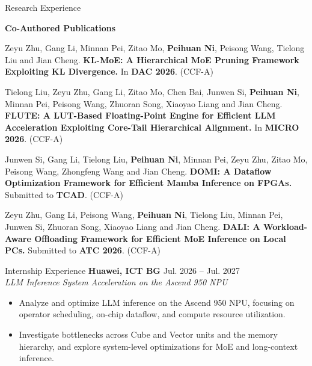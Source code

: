 \documentclass{resume}
\newenvironment{publicationentry}{\begin{list}{}{\setlength{\leftmargin}{0.6em}\setlength{\rightmargin}{0em}\setlength{\topsep}{3pt}\setlength{\partopsep}{0pt}\setlength{\parsep}{0pt}\setlength{\itemsep}{0pt}}\item[]}{\end{list}}
\begin{document}
\begin{rSection}{Research Experience}

\textbf{Co-Authored Publications}
\begin{publicationentry}
Zeyu Zhu, Gang Li, Minnan Pei, Zitao Mo, \textbf{Peihuan Ni}, Peisong Wang, Tielong Liu and Jian Cheng.
\textbf{KL-MoE: A Hierarchical MoE Pruning Framework Exploiting KL Divergence.}
In \textbf{DAC 2026}. (CCF-A)
\end{publicationentry}
\begin{publicationentry}
Tielong Liu, Zeyu Zhu, Gang Li, Zitao Mo, Chen Bai, Junwen Si, \textbf{Peihuan Ni}, Minnan Pei, Peisong Wang, Zhuoran Song, Xiaoyao Liang and Jian Cheng.
\textbf{FLUTE: A LUT-Based Floating-Point Engine for Efficient LLM Acceleration Exploiting Core-Tail Hierarchical Alignment.}
In \textbf{MICRO 2026}. (CCF-A)
\end{publicationentry}
\begin{publicationentry}
Junwen Si, Gang Li, Tielong Liu, \textbf{Peihuan Ni}, Minnan Pei, Zeyu Zhu, Zitao Mo, Peisong Wang, Zhongfeng Wang and Jian Cheng.
\textbf{DOMI: A Dataflow Optimization Framework for Efficient Mamba Inference on FPGAs.}
Submitted to \textbf{TCAD}. (CCF-A)
\end{publicationentry}
\begin{publicationentry}
Zeyu Zhu, Gang Li, Peisong Wang, \textbf{Peihuan Ni}, Tielong Liu, Minnan Pei, Junwen Si, Zhuoran Song, Xiaoyao Liang and Jian Cheng.
\textbf{DALI: A Workload-Aware Offloading Framework for Efficient MoE Inference on Local PCs.}
Submitted to \textbf{ATC 2026}. (CCF-A)
\end{publicationentry}
\end{rSection}

\begin{rSection}{Internship Experience}
\textbf{Huawei, ICT BG} \hfill Jul. 2026 -- Jul. 2027\\
\textit{LLM Inference System Acceleration on the Ascend 950 NPU}
\begin{itemize}
\item Analyze and optimize LLM inference on the Ascend 950 NPU, focusing on operator scheduling, on-chip dataflow, and compute resource utilization.
\item Investigate bottlenecks across Cube and Vector units and the memory hierarchy, and explore system-level optimizations for MoE and long-context inference.
\end{itemize}
\end{rSection}
\end{document}
